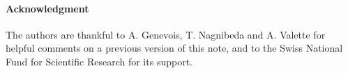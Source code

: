 \paragraph{Acknowledgment}
The authors are thankful to A. Genevois, T. Nagnibeda and A. Valette for helpful comments on a previous version of this note, and to the Swiss National Fund for Scientific Research for its support.
%
%
%

